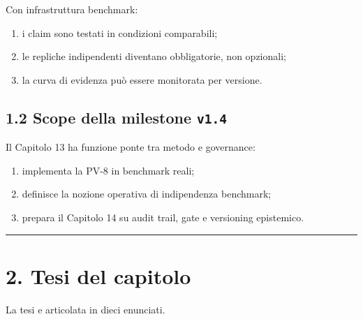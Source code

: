 Con infrastruttura benchmark:

\begin{enumerate}
\def\labelenumi{\arabic{enumi}.}
\tightlist
\item
  i claim sono testati in condizioni comparabili;
\item
  le repliche indipendenti diventano obbligatorie, non opzionali;
\item
  la curva di evidenza può essere monitorata per versione.
\end{enumerate}

\subsection{\texorpdfstring{1.2 Scope della milestone \texttt{v1.4}}{1.2 Scope della milestone v1.4}}

Il Capitolo 13 ha funzione ponte tra metodo e governance:

\begin{enumerate}
\def\labelenumi{\arabic{enumi}.}
\tightlist
\item
  implementa la PV-8 in benchmark reali;
\item
  definisce la nozione operativa di indipendenza benchmark;
\item
  prepara il Capitolo 14 su audit trail, gate e versioning epistemico.
\end{enumerate}

\begin{center}\rule{0.5\linewidth}{0.5pt}\end{center}

\section{2. Tesi del capitolo}

La tesi e articolata in dieci enunciati.

